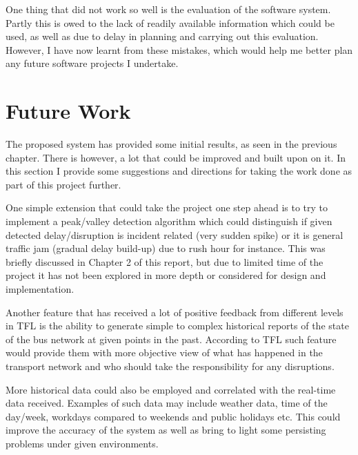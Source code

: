 One thing that did not work so well is the evaluation of the software system. Partly this is owed to the lack of readily available information which could be used, as well as due to delay in planning and carrying out this evaluation. However, I have now learnt from these mistakes, which would help me better plan any future software projects I undertake.


\section{Future Work}
The proposed system has provided some initial results, as seen in the previous chapter. There is however, a lot that could be improved and built upon on it. In this section I provide some suggestions and directions for taking the work done as part of this project further.

One simple extension that could take the project one step ahead is to try to implement a peak/valley detection algorithm which could distinguish if given detected delay/disruption is incident related (very sudden spike) or it is general traffic jam (gradual delay build-up) due to rush hour for instance. This was briefly discussed in Chapter 2 of this report, but due to limited time of the project it has not been explored in more depth or considered for design and implementation.

Another feature that has received a lot of positive feedback from different levels in TFL is the ability to generate simple to complex historical reports of the state of the bus network at given points in the past. According to TFL such feature would provide them with more objective view of what has happened in the transport network and who should take the responsibility for any disruptions. 

More historical data could also be employed and correlated with the real-time data received. Examples of such data may include weather data, time of the day/week, workdays compared to weekends and public holidays etc. This could improve the accuracy of the system as well as bring to light some persisting problems under given environments.

